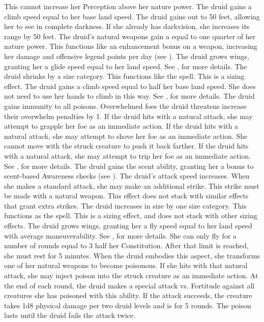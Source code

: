 This cannot increase her Perception above her nature power.
The druid gains a climb speed equal to her base land speed.
The druid gains  out to 50 feet, allowing her to see in complete darkness.
If she already has darkvision, she increases its range by 50 feet.
The druid's natural weapons gain a  equal to one quarter of her nature power.
This functions like an enhancement bonus on a weapon, increasing her damage and offensive legend points per day (see ).
The druid grows wings, granting her a glide speed equal to her land speed.
See , for more details.
The druid shrinks by a size category.
This functions like the  spell.
This is a sizing effect.
The druid gains a climb speed equal to half her base land speed.
She does not need to use her hands to climb in this way.
See , for more details.
The druid gains immunity to all poisons.
Overwhelmed foes the druid threatens increase their overwhelm penalties by 1.
If the druid hits with a natural attack, she may attempt to grapple her foe as an immediate action.
If the druid hits with a natural attack, she may attempt to shove her foe as an immediate action.
She cannot move with the struck creature to push it back farther.
If the druid hits with a natural attack, she may attempt to trip her foe as an immediate action.
See , for more details.
The druid gains the scent ability, granting her a  bonus to scent-based Awareness checks (see ).
The druid's attack speed increases.
When she makes a standard attack, she may make an additional strike.
This strike must be made with a natural weapon.
This effect does not stack with similar effects that grant extra strikes.
The druid increases in size by one size category.
This functions as the  spell.
This is a sizing effect, and does not stack with other sizing effects.
The druid grows wings, granting her a fly speed equal to her land speed with average maneuverability.
See , for more details.
She can only fly for a number of rounds equal to 3 \add half her Constitution.
After that limit is reached, she must rest for 5 minutes.
When the druid embodies this aspect, she transforms one of her natural weapons to become poisonous.
If she hits with that natural attack, she may inject poison into the struck creature as an immediate action.
At the end of each round, the druid makes a special attack vs. Fortitude against all creatures she has poisoned with this ability.
If the attack succeeds, the creature takes 1d8 physical damage per two druid levels and is \sickened for 5 rounds.
The poison lasts until the druid fails the attack twice.

